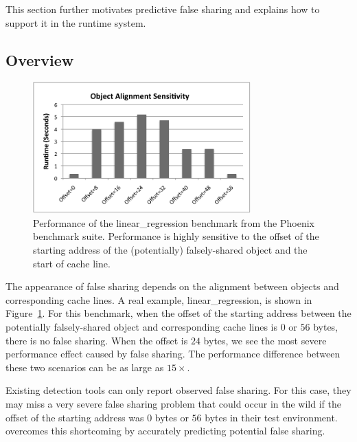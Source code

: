 \label{sec:prediction}
This section further motivates predictive false sharing and explains how to support it in the runtime system.  

\subsection{Overview}
\label{sec:predictoverview}

\begin{figure}[!t]
\begin{center}
\includegraphics[width=3.3in]{predator/figure/perfsensitive}
\end{center}
\caption{
Performance of the linear\_regression benchmark from the Phoenix benchmark suite.
Performance is highly sensitive to the offset of the starting address of the (potentially) falsely-shared object 
and the start of cache line. 
\label{fig:perfsensitive}}
\end{figure}

The appearance of false sharing depends on 
the alignment between objects and corresponding cache lines.
A real example, linear\_regression, is shown in Figure~\ref{fig:perfsensitive}.
For this benchmark, when the offset of the starting address between the potentially falsely-shared object and corresponding cache lines is $0$ or $56$ bytes, 
there is no false sharing. 
When the offset is $24$ bytes, we see the most severe performance effect caused by false sharing. 
The performance difference between these two scenarios can be as large as $15\times$. 

Existing detection tools can only report observed false sharing. For this case, they may miss a very severe false sharing problem that could occur in the wild if the offset of the starting address was $0$ bytes or $56$ bytes in their test environment.
\Predator{} overcomes this shortcoming by accurately predicting potential false sharing.

